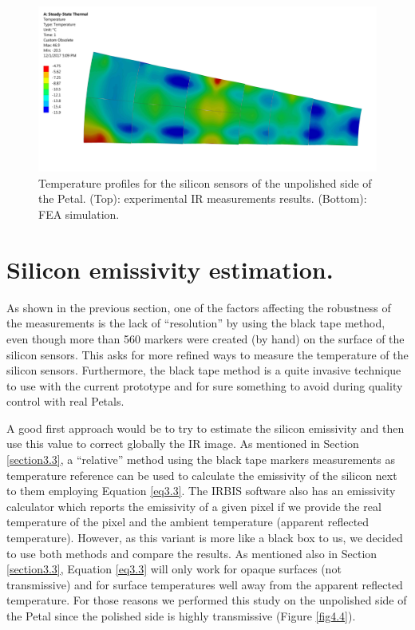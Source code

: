 \begin{figure}[ht!]
			\includegraphics[scale=0.045]{Figures/Chapter04/FEA_thermogram_markers_9_201711271006.jpg}
			\caption{Temperature profiles for the silicon sensors of the unpolished side of the Petal. (Top): experimental IR measurements results. (Bottom): FEA simulation.}\label{fig4.3}
		\end{figure}	
	
	\section{Silicon emissivity estimation.}\label{section4.3}	
	
		As shown in the previous section, one of the factors affecting the robustness of the measurements is the lack of “resolution” by using the black tape method, even though more than 560 markers were created (by hand) on the surface of the silicon sensors. This asks for more refined ways to measure the temperature of the silicon sensors. Furthermore, the black tape method is a quite invasive technique to use with the current prototype and for sure something to avoid during quality control with real Petals.
		
		A good first approach would be to try to estimate the silicon emissivity and then use this value to correct globally the IR image. As mentioned in Section \ref{section3.3}, a “relative” method using the black tape markers measurements as temperature reference can be used to calculate the emissivity of the silicon next to them employing Equation \ref{eq3.3}. The IRBIS software also has an emissivity calculator which reports the emissivity of a given pixel if we provide the real temperature of the pixel and the ambient temperature (apparent reflected temperature). However, as this variant is more like a black box to us, we decided to use both methods and compare the results. As mentioned also in Section \ref{section3.3}, Equation \ref{eq3.3} will only work for opaque surfaces (not transmissive) and for surface temperatures well away from the apparent reflected temperature. For those reasons we performed this study on the unpolished side of the Petal since the polished side is highly transmissive (Figure \ref{fig4.4}).
		
